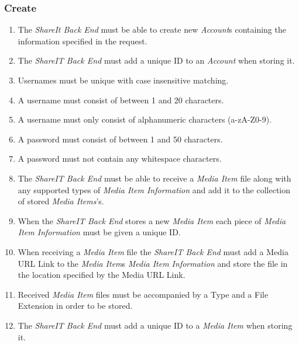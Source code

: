 \subsubsection{Create}
\begin{enumerate}[label=\textbf{FR-\twodigits*},resume]

\item The \textit{ShareIt Back End} must be able to create new \textit{Account}s containing the information specified in the request.

\item The \textit{ShareIT Back End} must add a unique ID to an \textit{Account} when storing it.

\item Usernames must be unique with case insensitive matching.

\item A username must consist of between 1 and 20 characters.

\item A username must only consist of alphanumeric characters (a-zA-Z0-9).

\item A password must consist of between 1 and 50 characters. 

\item A password must not contain any whitespace characters.

\item The \textit{ShareIT Back End} must be able to receive a \textit{Media Item} file along with any supported types of \textit{Media Item Information} and add it to the collection of stored \textit{Media Items}'s.

\item When the \textit{ShareIT Back End} stores a new \textit{Media Item} each piece of \textit{Media Item Information} must be given a unique ID.

\item When receiving a \textit{Media Item} file the \textit{ShareIT Back End} must add a Media URL Link to the \textit{Media Item}s \textit{Media Item Information} and store the file in the location specified by the Media URL Link.

\item Received \textit{Media Item} files must be accompanied by a Type and a File Extension in order to be stored.

\item The \textit{ShareIT Back End} must add a unique ID to a \textit{Media Item} when storing it.


\end{enumerate}
